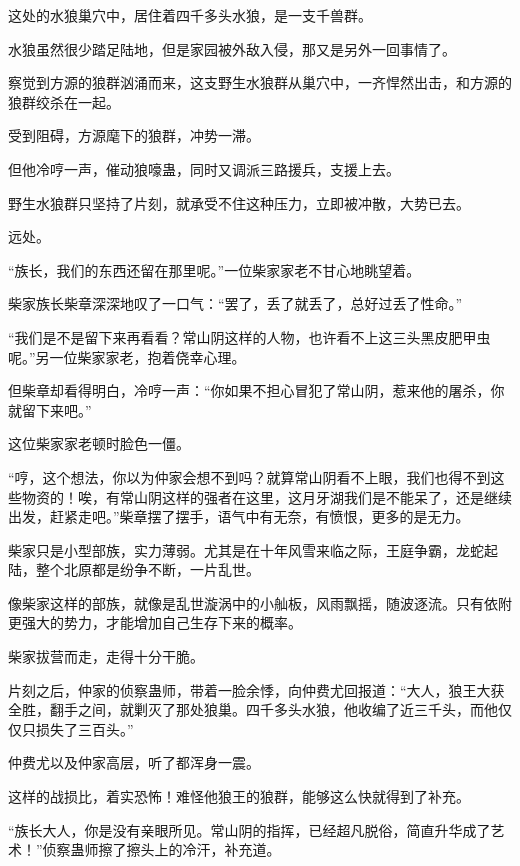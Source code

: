 
\begin{this_body}



这处的水狼巢穴中，居住着四千多头水狼，是一支千兽群。

水狼虽然很少踏足陆地，但是家园被外敌入侵，那又是另外一回事情了。

察觉到方源的狼群汹涌而来，这支野生水狼群从巢穴中，一齐悍然出击，和方源的狼群绞杀在一起。

受到阻碍，方源麾下的狼群，冲势一滞。

但他冷哼一声，催动狼嚎蛊，同时又调派三路援兵，支援上去。

野生水狼群只坚持了片刻，就承受不住这种压力，立即被冲散，大势已去。

远处。

“族长，我们的东西还留在那里呢。”一位柴家家老不甘心地眺望着。

柴家族长柴章深深地叹了一口气：“罢了，丢了就丢了，总好过丢了性命。”

“我们是不是留下来再看看？常山阴这样的人物，也许看不上这三头黑皮肥甲虫呢。”另一位柴家家老，抱着侥幸心理。

但柴章却看得明白，冷哼一声：“你如果不担心冒犯了常山阴，惹来他的屠杀，你就留下来吧。”

这位柴家家老顿时脸色一僵。

“哼，这个想法，你以为仲家会想不到吗？就算常山阴看不上眼，我们也得不到这些物资的！唉，有常山阴这样的强者在这里，这月牙湖我们是不能呆了，还是继续出发，赶紧走吧。”柴章摆了摆手，语气中有无奈，有愤恨，更多的是无力。

柴家只是小型部族，实力薄弱。尤其是在十年风雪来临之际，王庭争霸，龙蛇起陆，整个北原都是纷争不断，一片乱世。

像柴家这样的部族，就像是乱世漩涡中的小舢板，风雨飘摇，随波逐流。只有依附更强大的势力，才能增加自己生存下来的概率。

柴家拔营而走，走得十分干脆。

片刻之后，仲家的侦察蛊师，带着一脸余悸，向仲费尤回报道：“大人，狼王大获全胜，翻手之间，就剿灭了那处狼巢。四千多头水狼，他收编了近三千头，而他仅仅只损失了三百头。”

仲费尤以及仲家高层，听了都浑身一震。

这样的战损比，着实恐怖！难怪他狼王的狼群，能够这么快就得到了补充。

“族长大人，你是没有亲眼所见。常山阴的指挥，已经超凡脱俗，简直升华成了艺术！”侦察蛊师擦了擦头上的冷汗，补充道。


\end{this_body}
